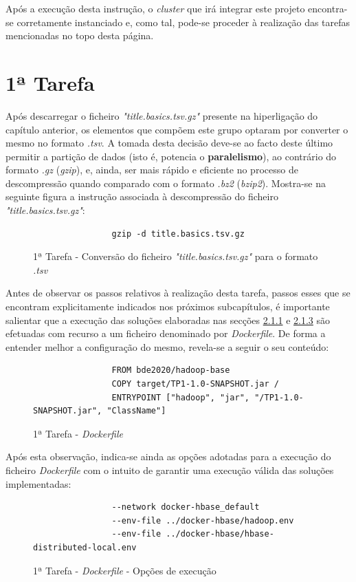 \documentclass[a4paper]{report}
\begin{document}
{		Após a execução desta instrução, o \textit{cluster} que irá integrar este projeto encontra-se corretamente instanciado e, como tal, pode-se proceder à realização das tarefas mencionadas no topo desta página.
		
		\section{1ª Tarefa} \label{sec:Task1}
		Após descarregar o ficheiro \textit{"title.basics.tsv.gz"} presente na hiperligação do capítulo anterior, os elementos que compõem este grupo optaram por converter o mesmo no formato \textit{.tsv}. 
		A tomada desta decisão deve-se ao facto deste último permitir a partição de dados (isto é, potencia o \textbf{paralelismo}), ao contrário do formato \textit{.gz} (\textit{gzip}), e, ainda, ser mais rápido e eficiente no processo de descompressão quando comparado com o formato \textit{.bz2} (\textit{bzip2}).
		Mostra-se na seguinte figura a instrução associada à descompressão do ficheiro \textit{"title.basics.tsv.gz"}:
		\begin{figure}[H]
			{
				\color{teal}
				\begin{verbatim}
				gzip -d title.basics.tsv.gz
				\end{verbatim}
			}
			\caption{1ª Tarefa - Conversão do ficheiro \textit{"title.basics.tsv.gz"} para o formato \textit{.tsv}}
			\label{fig:2}
		\end{figure}
		
		Antes de observar os passos relativos à realização desta tarefa, passos esses que se encontram explicitamente indicados nos próximos subcapítulos, é importante salientar que a execução das soluções elaboradas nas secções \hyperref[subsec:Task1-1]{2.1.1} e \hyperref[subsec:Task1-3]{2.1.3} são efetuadas com recurso a um ficheiro denominado por \textit{Dockerfile}.
		De forma a entender melhor a configuração do mesmo, revela-se a seguir o seu conteúdo:
		\begin{figure}[H]
			{
				\color{teal}
				\begin{verbatim}
				FROM bde2020/hadoop-base
				COPY target/TP1-1.0-SNAPSHOT.jar /
				ENTRYPOINT ["hadoop", "jar", "/TP1-1.0-SNAPSHOT.jar", "ClassName"]
				\end{verbatim}
			}
			\caption{1ª Tarefa - \textit{Dockerfile}}
			\label{fig:3}
		\end{figure}
		
		Após esta observação, indica-se ainda as opções adotadas para a execução do ficheiro \textit{Dockerfile} com o intuito de garantir uma execução válida das soluções implementadas:
		\begin{figure}[H]
			{
				\color{teal}
				\begin{verbatim}
				--network docker-hbase_default
				--env-file ../docker-hbase/hadoop.env
				--env-file ../docker-hbase/hbase-distributed-local.env
				\end{verbatim}
			}
			\caption{1ª Tarefa - \textit{Dockerfile} - Opções de execução}
			\label{fig:4}
		\end{figure}
		
}
\end{document}
